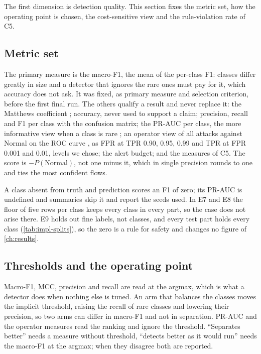 The first dimension is detection quality. This section fixes the metric set, how the
operating point is chosen, the cost-sensitive view and the rule-violation rate of C5.

\subsection{Metric set}
\label{sec:metric-set}

The primary measure is the macro-F1, the mean of the per-class F1: classes differ greatly in
size and a detector that ignores the rare ones must pay for it, which accuracy does not
ask. It was fixed, as primary measure and selection criterion, before the first final run.
The others qualify a result and never replace it: the Matthews coefficient
\citep{chicco2020mcc}; accuracy, never used to support a claim; precision, recall and F1 per class with
the confusion matrix; the PR-AUC per class, the more informative view when a class is rare
\citep{davis2006relationship,saito2015precision}; an operator view of all attacks against
Normal on the ROC curve \citep{fawcett2006introduction}, as FPR at TPR 0.90, 0.95, 0.99 and
TPR at FPR 0.001 and 0.01, levels we chose; the alert budget; and the measures of C5. The score
is $-P(\text{Normal})$, not one minus it, which in single precision rounds to one and ties the
most confident flows.

A class absent from truth and prediction scores an F1 of zero; its PR-AUC is undefined and
summaries skip it and report the seeds used. In E7 and E8 the floor of five rows per class keeps
every class in every part, so the case does not arise there. E9 holds out fine labels, not
classes, and every test part holds every class (\cref{tab:impl-splits}), so the zero is a rule
for safety and changes no figure of \cref{ch:results}.

\subsection{Thresholds and the operating point}
\label{sec:operating-point}

Macro-F1, MCC, precision and recall are read at the argmax, which is what a detector does when
nothing else is tuned. An arm that balances the classes moves the implicit threshold, raising
the recall of rare classes and lowering their precision, so two arms can differ in macro-F1
and not in separation. PR-AUC and the operator measures read the ranking and ignore the
threshold. ``Separates better'' needs a measure without threshold, ``detects better as it
would run'' needs the macro-F1 at the argmax; when they disagree both are reported.

